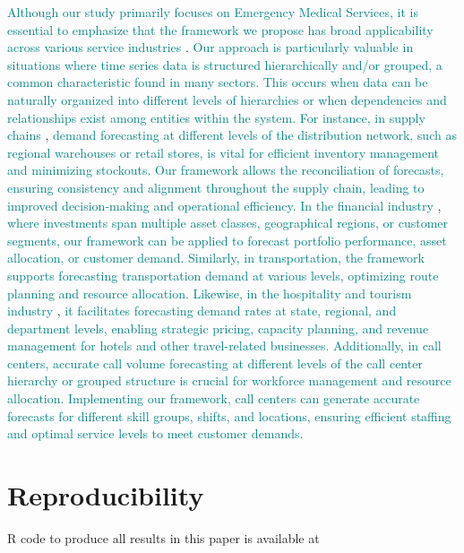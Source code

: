 \documentclass[
  authoryear,
  preprint,
  3p]{elsarticle}
\begin{document}
\textcolor{teal}{Although our study primarily focuses on Emergency Medical Services, it is essential to emphasize that the framework we propose has broad applicability across various service industries}
\citep{ostrom2010moving}.
\textcolor{teal}{Our approach is particularly valuable in situations where time series data is structured hierarchically and/or grouped, a common characteristic found in many sectors. This occurs when data can be naturally organized into different levels of hierarchies or when dependencies and relationships exist among entities within the system. For instance, in supply chains}
\citep{shugan2000advance},
\textcolor{teal}{demand forecasting at different levels of the distribution network, such as regional warehouses or retail stores, is vital for efficient inventory management and minimizing stockouts. Our framework allows the reconciliation of forecasts, ensuring consistency and alignment throughout the supply chain, leading to improved decision-making and operational efficiency. In the financial industry}
\citep{kimes1998strategic},
\textcolor{teal}{where investments span multiple asset classes, geographical regions, or customer segments, our framework can be applied to forecast portfolio performance, asset allocation, or customer demand. Similarly, in transportation, the framework supports forecasting transportation demand at various levels, optimizing route planning and resource allocation. Likewise, in the hospitality and tourism industry}
\citep{dekimpe2016impact},
\textcolor{teal}{it facilitates forecasting demand rates at state, regional, and department levels, enabling strategic pricing, capacity planning, and revenue management for hotels and other travel-related businesses. Additionally, in call centers, accurate call volume forecasting at different levels of the call center hierarchy or grouped structure is crucial for workforce management and resource allocation. Implementing our framework, call centers can generate accurate forecasts for different skill groups, shifts, and locations, ensuring efficient staffing and optimal service levels to meet customer demands.}

\hypertarget{reproducibility}{%
\section*{Reproducibility}\label{reproducibility}}

R code to produce all results in this paper is available at


\renewcommand\refname{References}
  
\end{document}
